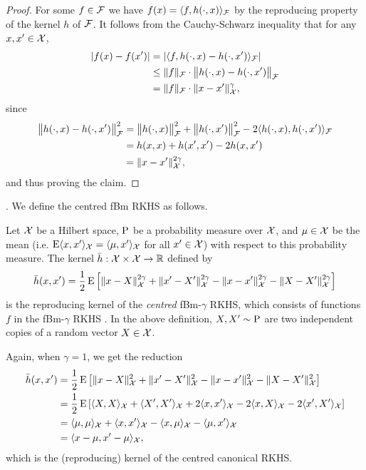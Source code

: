 \begin{proof}
  For some $f \in {\mathcal F}$ we have $f(x) = \langle f,h(\cdot,x)\rangle_{\mathcal F}$ by the reproducing property of the kernel $h$ of ${\mathcal F}$.
  It follows from the Cauchy-Schwarz inequality that for any $x,x'\in{\mathcal X}$,
  \begin{align*}
    \vert f(x) - f(x') \vert 
    &= \vert \langle f,h(\cdot,x) - h(\cdot,x')\rangle_{\mathcal F} \vert \\
    &\leq \lVert f\rVert_{\mathcal F} \cdot \big\Vert h(\cdot,x) - h(\cdot,x') \big\Vert_{\mathcal F} \\
    &= \lVert f\rVert_{\mathcal F} \cdot \lVert x-x'\rVert_{\mathcal X}^{\gamma},
  \end{align*}
  since
  \begin{align*}
    \big\Vert h(\cdot,x) - h(\cdot,x') \big\Vert_{\mathcal F} ^2
    &= \big\Vert h(\cdot,x) \big\Vert_{\mathcal F} ^2 + \big\Vert h(\cdot,x') \big\Vert_{\mathcal F} ^2 - 2 \langle h(\cdot,x),h(\cdot,x')\rangle_{\mathcal F} \\
    &= h(x,x) + h(x',x') - 2 h(x,x') \\
    &= \lVert x-x'\rVert_{\mathcal X}^{2\gamma},
  \end{align*}  
  and thus proving the claim.
\end{proof}

.
We define the centred fBm RKHS as follows.

\begin{definition}
  Let ${\mathcal X}$ be a Hilbert space, $\operatorname{P}$ be a probability measure over ${\mathcal X}$, and $\mu\in{\mathcal X}$ be the mean (i.e. $\operatorname{E}\langle x,x'\rangle_{{\mathcal X}}  = \langle\mu,x'\rangle_{{\mathcal X}}$ for all $x' \in {\mathcal X}$) with respect to this probability measure.
  The kernel $\bar h:{\mathcal X}\times{\mathcal X}\to\mathbb{R}$ defined by
  \[
    \bar h(x,x') = \frac{1}{2} \operatorname{E} \left[ \lVert x-X\rVert_{\mathcal X}^{2\gamma} + \lVert x'-X'\rVert_{\mathcal X}^{2\gamma} - \lVert x-x'\rVert_{\mathcal X}^{2\gamma} - \lVert X-X'\rVert_{\mathcal X}^{2\gamma} \right]
  \]
  is the reproducing kernel of the \emph{centred} fBm-$\gamma$ RKHS, which consists of functions $f$ in the fBm-$\gamma$ RKHS .
  In the above definition, $X,X' \sim \operatorname{P}$ are two independent copies of a random vector $X \in {\mathcal X}$.
\end{definition}

\begin{remark}
  Again, when $\gamma=1$, we get the reduction 
  \begin{align*}
    \bar h(x,x') 
    &= \frac{1}{2} \operatorname{E} \left[ \lVert x-X\rVert_{\mathcal X}^{2} + \lVert x'-X'\rVert_{\mathcal X}^{2} - \lVert x-x'\rVert_{\mathcal X}^{2} - \lVert X-X'\rVert_{\mathcal X}^{2} \right] \\
    &= \frac{1}{2} \operatorname{E} \left[ \langle X,X\rangle_{\mathcal X} + \langle X',X'\rangle_{\mathcal X} + 2\langle x,x'\rangle_{\mathcal X} - 2\langle x,X\rangle_{\mathcal X} - 2\langle x',X'\rangle_{\mathcal X}\right] \\
    &= \langle\mu,\mu\rangle_{\mathcal X} + \langle x,x'\rangle_{\mathcal X} - \langle x,\mu\rangle_{\mathcal X} - \langle\mu,x'\rangle_{\mathcal X} \\
    &= \langle x-\mu,x'-\mu\rangle_{\mathcal X},
  \end{align*}
  which is the (reproducing) kernel of the centred canonical RKHS.
\end{remark}

